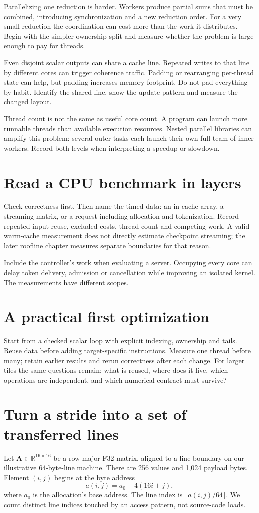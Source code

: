Parallelizing one reduction is harder. Workers produce partial sums
that must be combined, introducing synchronization and a new reduction
order. For a very small reduction the coordination can cost more
than the work it distributes. Begin with the simpler ownership split
and measure whether the problem is large enough to pay for threads.

Even disjoint scalar outputs can share a cache line. Repeated writes
to that line by different cores can trigger coherence traffic.
Padding or rearranging per-thread state can help, but padding increases
memory footprint. Do not pad everything by habit. Identify the shared
line, show the update pattern and measure the changed layout.

Thread count is not the same as useful core count. A program can
launch more runnable threads than available execution resources.
Nested parallel libraries can amplify this problem: several outer
tasks each launch their own full team of inner workers. Record both
levels when interpreting a speedup or slowdown.

\section{Read a CPU benchmark in layers}
Check correctness first. Then name the timed data: an in-cache array,
a streaming matrix, or a request including allocation and tokenization.
Record repeated input reuse, excluded costs, thread count and competing
work. A valid warm-cache measurement does not directly estimate
checkpoint streaming; the later roofline chapter measures separate
boundaries for that reason.

Include the controller's work when evaluating a server. Occupying every
core can delay token delivery, admission or cancellation while improving
an isolated kernel. The measurements have different scopes.

\section{A practical first optimization}
Start from a checked scalar loop with explicit indexing, ownership
and tails. Reuse data before adding target-specific instructions.
Measure one thread before many; retain earlier results and rerun
correctness after each change. For larger tiles the same questions
remain: what is reused, where does it live, which operations are
independent, and which numerical contract must survive?
\section{Turn a stride into a set of transferred lines}
Let $\mathbf{A}\in\mathbb{R}^{16\times16}$ be a row-major F32
matrix, aligned to a line boundary on our illustrative 64-byte-line
machine. There are 256 values and 1,024 payload bytes. Element
$(i,j)$ begins at the byte address
\[
 a(i,j)=a_0+4(16i+j),
\]
where $a_0$ is the allocation's base address. The line index is
$\lfloor a(i,j)/64\rfloor$. We count distinct line indices touched
by an access pattern, not source-code loads.

